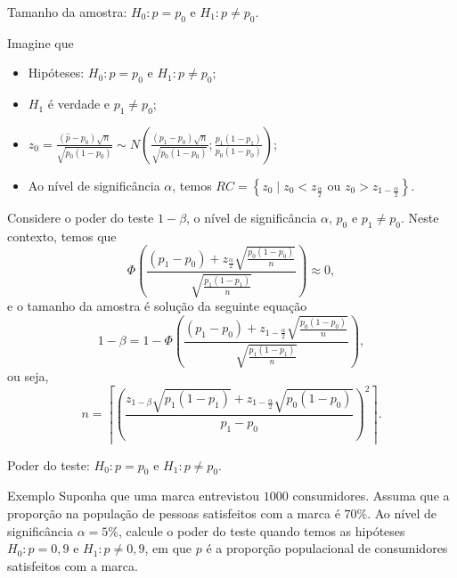 \documentclass[8pt]{beamer}
\begin{document}
\begin{frame}{Tamanho da amostra: $H_0: p = p_0$ e $H_1: p \neq p_0$.}

\footnotesize

Imagine que 
\begin{itemize}
	\item Hipóteses: $H_0:p=p_0$ e $H_1: p \neq p_0$;
	\item $H_1$ é verdade e $p_1 \neq p_0$;
	\item $z_0 = \frac{(\hat{p}-p_0)\sqrt{n}}{\sqrt{p_0 (1-p_0)}} \sim N \left( \frac{(p_1 - p_0)\sqrt{n}}{\sqrt{p_0(1-p_0)}}; \frac{p_1(1-p_1)}{p_0(1-p_0)} \right)$;
	\item Ao nível de significância $\alpha$, temos $RC = \left\{ z_0 \mid z_0 < z_\frac{\alpha}{2} \mbox{ ou } z_0 > z_{1-\frac{\alpha}{2}}  \right\}$.
\end{itemize}

Considere o poder do teste $1-\beta$, o nível de significância $\alpha$, $p_0$ e $p_1\neq p_0$. Neste contexto, temos que 
$$\Phi\left( \frac{ (p_1 - p_0) + z_\frac{\alpha}{2} \sqrt{\frac{p_0(1-p_0)}{n}} }{ \sqrt{\frac{p_1(1-p_1)}{n}} } \right) \approx 0,$$
e o tamanho da amostra é solução da seguinte equação
$$1-\beta =1- \Phi \left( \frac{ (p_1 - p_0) + z_{1-\frac{\alpha}{2}} \sqrt{\frac{p_0(1-p_0)}{n}} }{ \sqrt{\frac{p_1(1-p_1)}{n}} } \right), $$
ou seja, 
$$n = \left\lceil \left( \frac{ z_{1-\beta} \sqrt{p_1(1-p_1)} + z_{1-\frac{\alpha}{2}} \sqrt{p_0(1-p_0)} }{p_1 - p_0} \right)^2 \right\rceil.$$

\normalsize
\end{frame}

\begin{frame}{Poder do teste: $H_0: p = p_0$ e $H_1: p \neq p_0$.}

\large
\begin{block}{Exemplo}
	Suponha que uma marca entrevistou $1000$ consumidores. Assuma que a proporção na população de pessoas satisfeitos com a marca é $70\%$. Ao nível de significância $\alpha=5\%$, calcule o poder do teste quando temos as hipóteses $H_0: p = 0,9$ e $H_1: p\neq 0,9$, em que $p$ é a proporção populacional de consumidores satisfeitos com a marca.
\end{block}
\normalsize

\end{frame}
\end{document}
